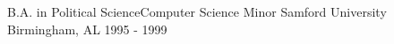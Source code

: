 


\begin{cventries}


\cventry
{B.A. in Political Science{\enskip\cdotp\enskip}Computer Science Minor} %
{Samford University} %
{Birmingham, AL} %
{1995 - 1999} %
{ %
}


\end{cventries}